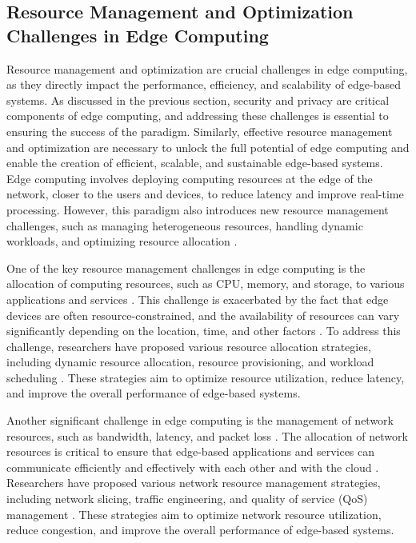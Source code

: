 \documentclass[11pt]{article}
\begin{document}
\subsection{Resource Management and Optimization Challenges in Edge Computing}

Resource management and optimization are crucial challenges in edge computing, as they directly impact the performance, efficiency, and scalability of edge-based systems. As discussed in the previous section, security and privacy are critical components of edge computing, and addressing these challenges is essential to ensuring the success of the paradigm. Similarly, effective resource management and optimization are necessary to unlock the full potential of edge computing and enable the creation of efficient, scalable, and sustainable edge-based systems. Edge computing involves deploying computing resources at the edge of the network, closer to the users and devices, to reduce latency and improve real-time processing. However, this paradigm also introduces new resource management challenges, such as managing heterogeneous resources, handling dynamic workloads, and optimizing resource allocation \cite{ref61}.

One of the key resource management challenges in edge computing is the allocation of computing resources, such as CPU, memory, and storage, to various applications and services \cite{ref62}. This challenge is exacerbated by the fact that edge devices are often resource-constrained, and the availability of resources can vary significantly depending on the location, time, and other factors \cite{ref63}. To address this challenge, researchers have proposed various resource allocation strategies, including dynamic resource allocation, resource provisioning, and workload scheduling \cite{ref64}. These strategies aim to optimize resource utilization, reduce latency, and improve the overall performance of edge-based systems.

Another significant challenge in edge computing is the management of network resources, such as bandwidth, latency, and packet loss \cite{ref65}. The allocation of network resources is critical to ensure that edge-based applications and services can communicate efficiently and effectively with each other and with the cloud \cite{ref66}. Researchers have proposed various network resource management strategies, including network slicing, traffic engineering, and quality of service (QoS) management \cite{ref67}. These strategies aim to optimize network resource utilization, reduce congestion, and improve the overall performance of edge-based systems.
\end{document}
